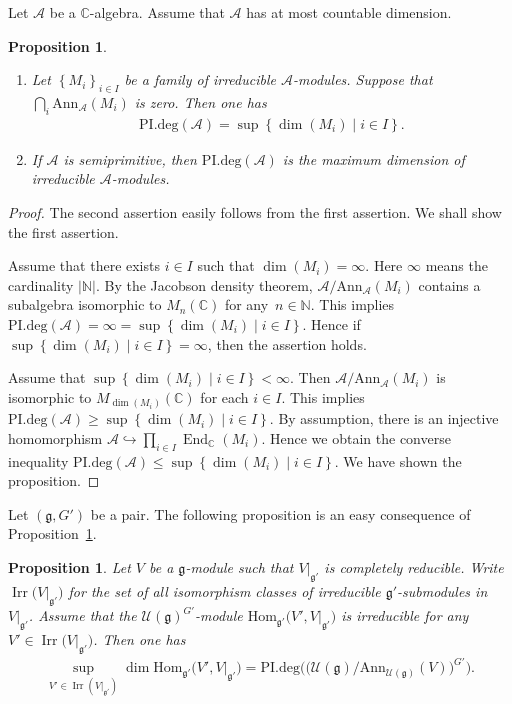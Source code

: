 \documentclass[pdftex]{sigma}
\numberwithin{equation}{section}
\newtheorem{Proposition}[Theorem]{Proposition}
\theoremstyle{definition}
\newcommand{\set}[1]{\left\{#1 \right\}}
\newcommand{\Hom}{\mathrm{Hom}}
\DeclareMathOperator{\End}{End}
\newcommand{\BasicRing}[1]{\mathbb{#1}}
\newcommand{\NN}{\BasicRing{N}}
\newcommand{\CC}{\BasicRing{C}}
\newcommand{\Ann}{\mathrm{Ann}}
\newcommand{\PIdeg}{\mathrm{PI.deg}}
\newcommand{\alg}[1]{\mathcal{#1}}
\newcommand{\lieC}[1]{\mathfrak{#1}}
\newcommand{\lie}[1]{\mathfrak{#1}}
\newcommand{\univ}[1]{\mathcal{U}(\lieC{#1})}
\DeclareMathOperator{\Irr}{\mathrm{Irr}}
\begin{document}
Let $\alg{A}$ be a $\CC$-algebra.
Assume that $\alg{A}$ has at most countable dimension.

\begin{Proposition}\label{prop:PIdegMaximumDim}\qquad
	\begin{enumerate}\itemsep=0pt
		\item[$1.$] Let $\set{M_i}_{i \in I}$ be a family of irreducible $\alg{A}$-modules.
		Suppose that $\bigcap_i \Ann_{\alg{A}}(M_i)$ is zero.
		Then one has
		\begin{align*}
			\PIdeg(\alg{A}) = \sup\set{\dim(M_i)\mid i \in I}.
		\end{align*}
		\item[$2.$] If $\alg{A}$ is semiprimitive, then $\PIdeg(\alg{A})$ is the maximum dimension of irreducible $\alg{A}$-modules.
	\end{enumerate}
\end{Proposition}

\begin{proof}
	The second assertion easily follows from the first assertion.
	We shall show the first assertion.

	Assume that there exists $i \in I$ such that $\dim(M_i) = \infty$.
	Here $\infty$ means the cardinality $|\NN|$.
	By the Jacobson density theorem, $\alg{A}/\Ann_{\alg{A}}(M_i)$ contains a subalgebra isomorphic to $M_n(\CC)$ for any~${n \in \NN}$.
	This implies $\PIdeg(\alg{A}) = \infty = \sup\set{\dim(M_i)\mid i \in I}$.
	Hence if ${\sup\set{\dim(M_i)\mid i \in I} = \infty}$, then the assertion holds.

	Assume that $\sup\set{\dim(M_i)\mid i \in I} < \infty$.
	Then $\alg{A}/\Ann_{\alg{A}}(M_i)$ is isomorphic to $M_{\dim(M_i)}(\CC)$ for each $i \in I$.
	This implies $\PIdeg(\alg{A}) \geq \sup\set{\dim(M_i)\mid i \in I}$.
	By assumption, there is an injective homomorphism $\alg{A} \hookrightarrow \prod_{i \in I} \End_{\CC}(M_i)$.
	Hence we obtain the converse inequality $\PIdeg(\alg{A}) \leq \sup\set{\dim(M_i)\mid i \in I}$.
	We have shown the proposition.
\end{proof}

Let $(\lie{g}, G')$ be a pair.
The following proposition is an easy consequence of Proposition~\ref{prop:PIdegMaximumDim}.

\begin{Proposition}\label{prop:PIdegMultiplicity}
	Let $V$ be a $\lie{g}$-module such that $V|_{\lie{g'}}$ is completely reducible.
	Write $\Irr\bigl(V|_{\lie{g'}}\bigr)$ for the set of all isomorphism classes of irreducible $\lie{g'}$-submodules in $V|_{\lie{g'}}$.
	Assume that the $\univ{g}^{G'}$-module $\Hom_{\lie{g'}}\bigl(V', V|_{\lie{g'}}\bigr)$ is irreducible for any $V' \in \Irr\bigl(V|_{\lie{g'}}\bigr)$.
	Then one has
	\begin{align*}
		\sup_{V' \in \Irr(V|_{\lie{g'}})} \dim \Hom_{\lie{g'}}\bigl(V', V|_{\lie{g'}}\bigr) = \PIdeg\bigl(\bigl(\univ{g}/\Ann_{\univ{g}}(V)\bigr)^{G'}\bigr).
	\end{align*}
\end{Proposition}
\end{document}
